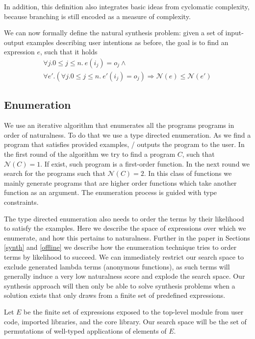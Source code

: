 In addition, this definition also integrates basic ideas from cyclomatic complexity, because branching is still encoded as a measure of complexity.

%
We can now formally define the natural synthesis problem: given a set of input-output examples describing user intentions as before, the goal is 
to find an expression $e$, such that it holds
\begin{multline*}
\forall j. 0 \le j \le n.\  e (i_j) = o_j \land \\
 \forall e'. (\forall j. 0 \le j \le n.\  e' (i_j) = o_j) \Rightarrow \mathcal{N}(e) \le \mathcal{N}(e')
\end{multline*}



\subsection{Enumeration}
\label{sec:enumeration}

We use an iterative algorithm that enumerates all the programs 
programs in order of naturalness. To do that we use a type directed enumeration. As we find a program that satisfies provided examples, \ourTool/ outputs the program to the user. In the first round of the algorithm we try to find a program $C$, such that $\mathcal{N}(C) = 1$.
If exist, such program is a first-order function. In the next round we search for the 
programs such that $\mathcal{N}(C) = 2$. In this class of functions we mainly generate programs that are higher order functions which take another function as an argument. The enumeration process is guided with type constraints.

The type directed enumeration also needs to order the terms by their likelihood to satisfy the examples.
Here we describe the space of expressions over which we enumerate, and how this pertains to naturalness.
Further in the paper in Sections \ref{synth} and \ref{offline} we describe how the enumeration technique tries to order terms by likelihood to succeed.
We can immediately restrict our search space to exclude generated lambda terms (anonymous functions), as such terms will generally induce a very low naturalness score and explode the search space.
Our synthesis approach will then only be able to solve synthesis problems when a solution exists that only draws from a finite set of predefined expressions.

Let $E$ be the finite set of expressions exposed to the top-level module from user code, imported libraries, and the core library.
Our search space will be the set of permutations of well-typed applications of elements of $E$.

